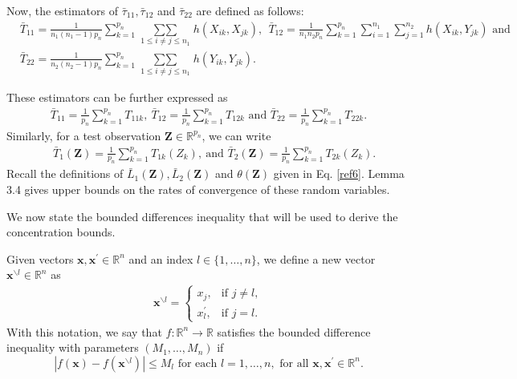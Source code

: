 \documentclass[twoside]{article}
\newcommand{\bZ}{\mathbf{Z}}
\newcommand{\bx}{\mathbf{x}}
\newcommand{\0}{\mathbf{0}}
\newcommand{\1}{\mathbf{1}}
\numberwithin{equation}{section}
\begin{document}
Now, the estimators of $\bar{\tau}_{11},\bar{\tau}_{12}$ and $\bar{\tau}_{22}$ are defined as follows:
\begin{align*}
 & \bar{T}_{11} = \frac{1}{n_1(n_1-1)p_n}\sum\limits_{k=1}^{p_n}\mathop{\sum\sum}\limits_{1\leq i\neq j\leq n_1}{h}(X_{ik},X_{jk}),\ \ \bar{T}_{12} = \frac{1}{n_1n_2 p_n}\sum\limits_{k=1}^{p_n}\sum\limits_{ i=1}^{n_1}\sum\limits_{ j=1}^{n_2}{h}(X_{ik},Y_{jk})\text{ and }\\
 & \bar{T}_{22} = \frac{1}{n_2(n_2-1)p_n}\sum\limits_{k=1}^{p_n}\mathop{\sum\sum}\limits_{1\leq i\neq j\leq n_1}{h}(Y_{ik},Y_{jk}).
\end{align*}

These estimators can be further expressed as
\begin{align*}
 {\bar{T}}_{11} = \frac{1}{p_n}\sum\limits_{k=1}^{p_n} T_{11k},\
 {\bar{T}}_{12} = \frac{1}{p_n}\sum\limits_{k=1}^{p_n} T_{12k}\text{ and }
 {\bar{T}}_{22}  = \frac{1}{p_n}\sum\limits_{k=1}^{p_n} T_{22k}.
\end{align*}
Similarly, for a test observation $\bZ\in\mathbb{R}^{p_n}$, we can write
\begin{align*}
&\ \bar{T}_{1}(\bZ) = \frac{1}{p_n}\sum\limits_{k=1}^{p_n}T_{1k}(Z_k),\ \text{and } \bar{T}_{2}(\bZ) = \frac{1}{p_n}\sum\limits_{k=1}^{p_n}T_{2k}(Z_k).
\end{align*}
Recall the definitions of $\bar{L}_1(\bZ),\bar{L}_2(\bZ)$ and $\theta(\bZ)$ given in Eq. \eqref{ref6}. Lemma 3.4 gives upper bounds on the rates of convergence of these random variables. \newline

We now state the bounded differences inequality that will be used to derive the concentration bounds.

Given vectors $\bx,\bx^\prime\in\mathbb{R}^n$ and an index $l\in\{1,\ldots,n\}$, we define a new vector $\bx^{\backslash l}\in\mathbb{R}^n$ as
\begin{align}\label{bdddiffprop}
 \bx^{\backslash l}=\begin{cases}
x_j,& \text{if } j\neq l,\\
x^{\prime}_l, &           \text{if } j= l.
\end{cases}
\end{align}
With this notation, we say that $f:\mathbb{R}^n\to\mathbb{R}$ satisfies the bounded difference inequality with parameters $(M_1,\ldots, M_n)$ if
$$|f(\bx)-f(\bx^{\backslash l})|\leq M_l\text{ for each }l=1,\ldots,n,\text{ for all }\bx,\bx^\prime\in\mathbb{R}^n.$$
\end{document}
